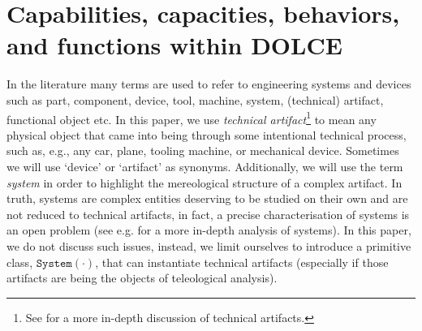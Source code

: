 \documentclass[sw]{iosart2x}
\newcommand{\generalStyle}[1]{\texttt{#1}}
\newcommand{\uniRel}[2]{\generalStyle{#1}(#2)}
\newcommand{\DOLCE}{\textsc{DOLCE}\xspace} %
\newcommand{\System}[1]{\uniRel{System}{#1}}
\newcommand{\firstTimeKeyWord}[1]{\textit{#1}}
\newcommand{\quotes}[1]{`#1'}
\begin{document}
\section{Capabilities, capacities, behaviors, and functions within \DOLCE \label{sec:capabilitiesEtc}}
In the literature many terms are used to refer to engineering systems and devices such as part, component, device, tool, machine, system, (technical) artifact, functional object etc. 
In this paper, we use \firstTimeKeyWord{technical artifact}\footnote{See \cite{borgoTechnicalArtifactsIntegrated2017} for a more in-depth discussion of technical artifacts.} to mean any physical object that came into being through some intentional technical process, such as, e.g., any car, plane, tooling machine, or mechanical device. %
Sometimes we will use \quotes{device} or \quotes{artifact} as synonyms. 
Additionally, we will use the term \firstTimeKeyWord{system} in order to highlight the mereological structure of a complex artifact. 
In truth, systems are complex entities deserving to be studied on their own and are not reduced to  technical artifacts, in fact, a precise characterisation of systems is an open problem (see e.g. \cite{mizoguchiRoleSystemicView2021} for a more in-depth analysis of systems). In this paper, we do not discuss such issues, instead, we limit ourselves to introduce a primitive class, $\System{\cdot}$,  that can instantiate technical artifacts (especially if those artifacts are being the objects of  teleological analysis).
\end{document}
